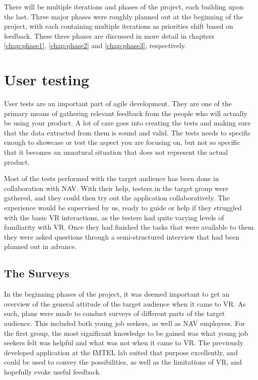 There will be multiple iterations and phases of the project, each building upon the last. Three major phases were roughly planned out at the beginning of the project, with each containing multiple iterations as priorities shift based on feedback. These three phases are discussed in more detail in chapters \ref{chap:phase1}, \ref{chap:phase2} and \ref{chap:phase3}, respectively.



\section{User testing}
User tests are an important part of agile development. They are one of the primary means of gathering relevant feedback from the people who will actually be using your product. A lot of care goes into creating the tests and making sure that the data extracted from them is sound and valid. The tests needs to specific enough to showcase or test the aspect you are focusing on, but not so specific that it becomes an unnatural situation that does not represent the actual product.

Most of the tests performed with the target audience has been done in collaboration with NAV. With their help, testers in the target group were gathered, and they could then try out the application collaboratively. The experience would be supervised by us, ready to guide or help if they struggled with the basic VR interactions, as the testers had quite varying levels of familiarity with VR. Once they had finished the tasks that were available to them they were asked questions through a semi-structured interview that had been planned out in advance.


\subsection{The Surveys}
In the beginning phases of the project, it was deemed important to get an overview of the general attitude of the target audience when it came to VR. As such, plans were made to conduct surveys of different parts of the target audience. This included both young job seekers, as well as NAV employees. For the first group, the most significant knowledge to be gained was what young job seekers felt was helpful and what was not when it came to VR. The previously developed application at the IMTEL lab suited that purpose excellently, and could be used to convey the possibilities, as well as the limitations of VR, and hopefully evoke useful feedback.

